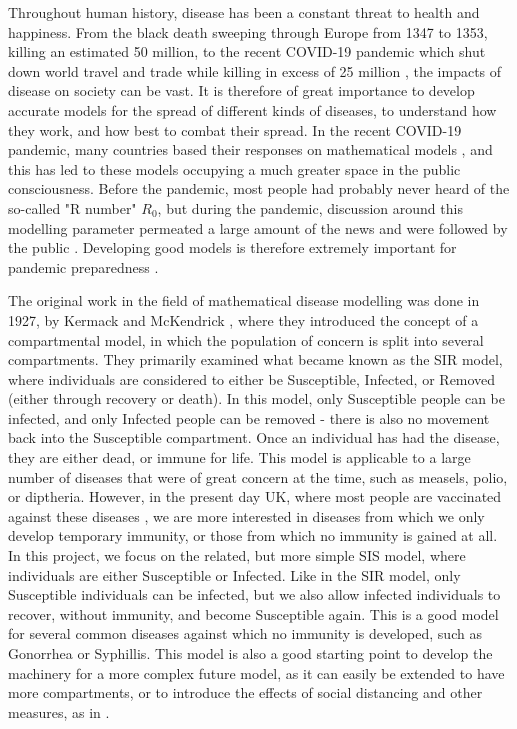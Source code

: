 \documentclass[12pt,a4paper,openany,twoside]{book}
\begin{document}
Throughout human history, disease has been a constant threat to health and happiness. From the black death sweeping through Europe from 1347 to 1353, killing an estimated 50 million, to the recent COVID-19 pandemic which shut down world travel and trade while killing in excess of 25 million \citep{dattaniWhatWereDeath2023}, the impacts of disease on society can be vast. It is therefore of great importance to develop accurate models for the spread of different kinds of diseases, to understand how they work, and how best to combat their spread. In the recent COVID-19 pandemic, many countries based their responses on mathematical models \citep{smithHowHaveMathematical2023}, and this has led to these models occupying a much greater space in the public consciousness. Before the pandemic, most people had probably never heard of the so-called "R number" $R_0$, but during the pandemic, discussion around this modelling parameter permeated a large amount of the news and were followed by the public \citep{bbcCoronavirusWhatNumber2020}. Developing good models is therefore extremely important for pandemic preparedness \citep{lancetHowModellingCan2024}.

The original work in the field of mathematical disease modelling was done in 1927, by Kermack and McKendrick \citep{kermackContributionMathematicalTheory1927}, where they introduced the concept of a compartmental model, in which the population of concern is split into several compartments. They primarily examined what became known as the SIR model, where individuals are considered to either be Susceptible, Infected, or Removed (either through recovery or death). In this model, only Susceptible people can be infected, and only Infected people can be removed - there is also no movement back into the Susceptible compartment. Once an individual has had the disease, they are either dead, or immune for life. This model is applicable to a large number of diseases that were of great concern at the time, such as measels, polio, or diptheria. However, in the present day UK, where most people are vaccinated against these diseases \citep{ukhsaVaccinationCoverageStatistics}, we are more interested in diseases from which we only develop temporary immunity, or those from which no immunity is gained at all. In this project, we focus on the related, but more simple SIS model, where individuals are either Susceptible or Infected. Like in the SIR model, only Susceptible individuals can be infected, but we also allow infected individuals to recover, without immunity, and become Susceptible again. This is a good model for several common diseases against which no immunity is developed, such as Gonorrhea or Syphillis. This model is also a good starting point to develop the machinery for a more complex future model, as it can easily be extended to have more compartments, or to introduce the effects of social distancing and other measures, as in \citet{croccoloSpreadingInfectionsRandom2020}.
\end{document}
